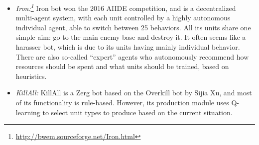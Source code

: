 \begin{itemize}
  
  \item {\em Iron:\footnote{\url{http://bwem.sourceforge.net/Iron.html}}} Iron bot won the 2016 AIIDE competition, and is a decentralized multi-agent system, with each unit controlled by a highly autonomous individual agent, able to switch between 25 behaviors. All its units share one simple aim: go to the main enemy base and destroy it. It often seems like a harasser bot, which is due to its units having mainly individual behavior. There are also so-called ``expert'' agents who autonomously recommend how resources should be spent and what units should be trained, based on heuristics. 
  
  
  \item {\em KillAll:} KillAll is a Zerg bot based on the Overkill bot by Sijia Xu, and most of its functionality is rule-based. However, its production module uses Q-learning to select unit types to produce based on the current situation. 
    

\end{itemize}
